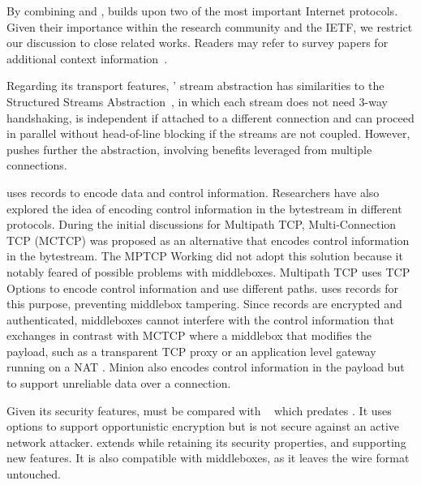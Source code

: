 
By combining \tcp and \tls, \tcpls builds upon two of the most important
Internet protocols. Given their importance within 
the research community and the IETF, we restrict our discussion to close
related works. Readers may refer to survey papers for additional 
context 
information~\cite{polese2019survey,li2016multipath,papastergiou2016ossifying}.

Regarding its transport features, \tcpls' stream abstraction has similarities to
the Structured Streams Abstraction~\cite{ford2007structured}, in which each
stream does not need 3-way handshaking, is independent if attached to a
different \tcp connection and can proceed in parallel without head-of-line
blocking if the streams are not coupled. However, \tcpls pushes further the
abstraction, involving benefits leveraged from multiple connections.

\tcpls uses \tls records to encode data and control information. Researchers
have also explored the idea of encoding control information in the bytestream in
different protocols. During the initial discussions for Multipath TCP,
Multi-Connection TCP (MCTCP) \cite{draft-scharf-mptcp-mctcp-01}
was proposed as an alternative that encodes control information in the bytestream.
The MPTCP Working did not adopt this solution because it notably feared of
possible problems with middleboxes. Multipath TCP \cite{raiciu2012hard,rfc6824}
uses TCP Options to encode control information and use different paths. \tcpls
uses \tls records for this purpose, preventing middlebox tampering.
Since \tls records are encrypted and
authenticated, middleboxes cannot interfere with the control information that
\tcpls exchanges in contrast with MCTCP where a middlebox that modifies the payload,
such as a transparent TCP proxy or an application level gateway running on a NAT \cite{rfc3027}.
Minion \cite{nowlan2012fitting} also encodes control information in the \tcp
payload but to support unreliable data over a connection.



Given its security features, \tcpls must be compared with 
\tcpcrypt~\cite{bittau2010case,rfc8548} which predates . It uses \tcp 
options to support opportunistic encryption but is not secure against an active 
network attacker. \tcpls extends \tls while retaining its security 
properties, and supporting new features. It is also compatible with \tcp 
middleboxes, as it leaves the \tcp wire format untouched.

